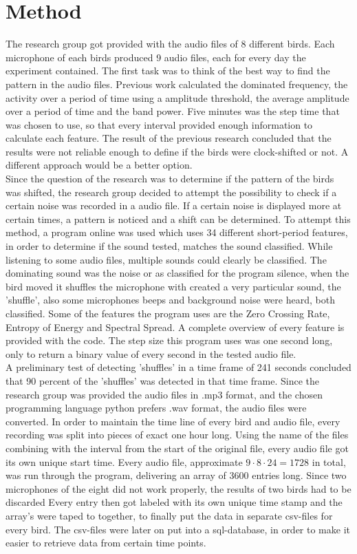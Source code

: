 \documentclass[a4paper]{article}
\begin{document}
\section*{Method}
The research group got provided with the audio files of 8 different birds. Each microphone of each birds produced 9 audio files, each for every day the experiment contained. The first task was to think of the best way to find the pattern in the audio files. Previous work calculated the dominated frequency, the activity over a period of time using a amplitude threshold, the average amplitude over a period of time and the band power. Five minutes was the step time that was chosen to use, so that every interval provided enough information to calculate each feature. The result of the previous research concluded that the results were not reliable enough to define if the birds were clock-shifted or not. A different approach would be a better option. \\
Since the question of the research was to determine if the pattern of the birds was shifted, the research group decided to attempt the possibility to check if a certain noise was recorded in a audio file. If a certain noise is displayed more at certain times, a pattern is noticed and a shift can be determined. To attempt this method, a program online was used which uses 34 different short-period features, in order to determine if the sound tested, matches the sound classified. While listening to some audio files, multiple sounds could clearly be classified. The dominating sound was the noise or as classified for the program silence, when the bird moved it shuffles the microphone with created a very particular sound, the 'shuffle', also some microphones beeps and background noise were heard, both classified. Some of the features the program uses are the Zero Crossing Rate, Entropy of Energy and Spectral Spread. A complete overview of every feature is provided with the code. The step size this program uses was one second long, only to return a binary value of every second in the tested audio file. \\
A preliminary test of detecting 'shuffles' in a time frame of 241 seconds concluded that 90 percent of the 'shuffles' was detected in that time frame. Since the research group was provided the audio files in .mp3 format, and the chosen programming language python prefers .wav format, the audio files were converted. In order to maintain the time line of every bird and audio file, every recording was split into pieces of exact one hour long. Using the name of the files combining with the interval from the start of the original file, every audio file got its own unique start time. Every audio file, approximate $9\cdot8\cdot24=1728$ in total, was run through the program, delivering an array of 3600 entries long. Since two microphones of the eight did not work properly, the results of two birds had to be discarded Every entry then got labeled with its own unique time stamp and the array's were taped to together, to finally put the data in separate csv-files for every bird. The csv-files were later on put into a sql-database, in order to make it easier to retrieve data from certain time points.\\
\end{document}

